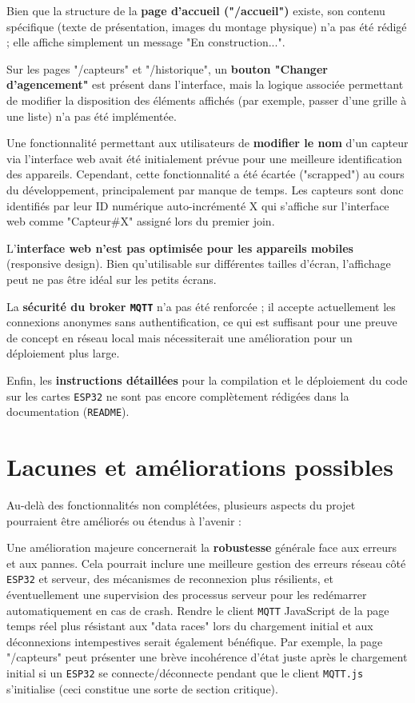 \documentclass[12pt]{article}
\begin{document}
Bien que la structure de la \textbf{page d'accueil ("/accueil")} existe, son contenu spécifique (texte de présentation, images du montage physique) n'a pas été rédigé ; elle affiche simplement un message "En construction...".

Sur les pages "/capteurs" et "/historique", un \textbf{bouton "Changer d'agencement"} est présent dans l'interface, mais la logique associée permettant de modifier la disposition des éléments affichés (par exemple, passer d'une grille à une liste) n'a pas été implémentée.

Une fonctionnalité permettant aux utilisateurs de \textbf{modifier le nom} d'un capteur via l'interface web avait été initialement prévue pour une meilleure identification des appareils. Cependant, cette fonctionnalité a été écartée ("scrapped") au cours du développement, principalement par manque de temps. Les capteurs sont donc identifiés par leur ID numérique auto-incrémenté X qui s'affiche sur l'interface web comme "Capteur\#X" assigné lors du premier join.

L'\textbf{interface web n'est pas optimisée pour les appareils mobiles} (responsive design). Bien qu'utilisable sur différentes tailles d'écran, l'affichage peut ne pas être idéal sur les petits écrans.

La \textbf{sécurité du broker \texttt{MQTT}} n'a pas été renforcée ; il accepte actuellement les connexions anonymes sans authentification, ce qui est suffisant pour une preuve de concept en réseau local mais nécessiterait une amélioration pour un déploiement plus large.

Enfin, les \textbf{instructions détaillées} pour la compilation et le déploiement du code sur les cartes \texttt{ESP32} ne sont pas encore complètement rédigées dans la documentation (\texttt{README}).

\section{Lacunes et améliorations possibles}

Au-delà des fonctionnalités non complétées, plusieurs aspects du projet pourraient être améliorés ou étendus à l'avenir :

Une amélioration majeure concernerait la \textbf{robustesse} générale face aux erreurs et aux pannes. Cela pourrait inclure une meilleure gestion des erreurs réseau côté \texttt{ESP32} et serveur, des mécanismes de reconnexion plus résilients, et éventuellement une supervision des processus serveur pour les redémarrer automatiquement en cas de crash. Rendre le client \texttt{MQTT} JavaScript de la page temps réel plus résistant aux "data races" lors du chargement initial et aux déconnexions intempestives serait également bénéfique. Par exemple, la page "/capteurs" peut présenter une brève incohérence d'état juste après le chargement initial si un \texttt{ESP32} se connecte/déconnecte pendant que le client \texttt{MQTT.js} s'initialise (ceci constitue une sorte de section critique).
\end{document}
